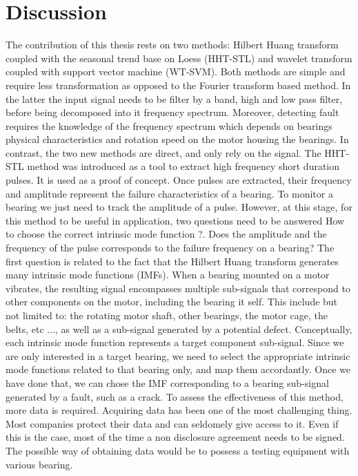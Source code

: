 \documentclass[thesis.tex]{subfiles}
\begin{document}
	\section{Discussion}
	\label{sec:discussion}
	The contribution of this thesis rests on two methods: Hilbert Huang transform coupled with the seasonal trend base on Loess (HHT-STL) and wavelet transform coupled with support vector machine (WT-SVM). Both methods are simple and require less transformation as opposed to the Fourier transform based method. In the latter the input signal needs to be filter by a band, high and low pass filter, before being decomposed into it frequency spectrum. Moreover, detecting fault requires the knowledge of the frequency spectrum which depends on bearings physical characteristics and rotation speed on the motor housing the bearings. In contrast, the two new methods are direct, and only rely on the signal.
	\justify
	The HHT-STL method was introduced as a tool to extract high frequency short duration pulses. It is used as a proof of concept. Once pulses are extracted, their frequency and amplitude represent the failure characteristics of a bearing. To monitor a bearing we just need to track the amplitude of a pulse. However, at this stage, for this method to be useful in application, two questions need to be answered 
	\justify
	How to choose the correct intrinsic mode function ?. Does the amplitude and the frequency of the pulse corresponds to the failure frequency on a bearing? 
	The first question is related to the fact that the Hilbert Huang transform generates many intrinsic mode functions (IMFs). When a bearing mounted on a motor vibrates, the resulting signal encompasses multiple sub-signals that correspond to other components on the motor, including the bearing it self. This include but not limited to: the rotating motor shaft, other bearings, the motor cage, the belts, etc $\dots$, as well as a sub-signal generated by a potential defect. Conceptually, each intrinsic mode function represents a target component sub-signal.
	Since we are only interested in a target bearing, we need to select the appropriate intrinsic mode functions related to that bearing only, and map them accordantly. Once we have done that, we can chose the IMF corresponding to a bearing sub-signal generated by a fault, such as a crack.
	\justify
	To assess the effectiveness of this method, more data is required. Acquiring data has been one of the most challenging thing. Most companies protect their data and can seldomely give access to it. Even if this is the case, most of the time a non disclosure agreement needs to be signed. The possible way of obtaining data would be to possess a testing equipment with various bearing.
\end{document}
